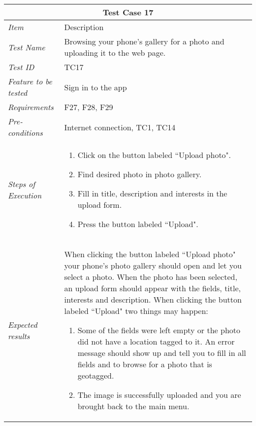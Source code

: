 %
\begin{minipage}{\linewidth}
\setlength{\tabcolsep}{15pt}
\centering
{}
\begin{tabular}{ |l|p{70mm}| }
	\hline
	\multicolumn{2}{|c|}{\cellcolor{gray!25} \textbf{Test Case 17}} \\
	\hline
	\it{\cellcolor{gray!25}Item} & {\cellcolor{gray!25} Description } \\
	\hline
	\it{\cellcolor{gray!25}Test Name } & Browsing your phone's gallery for a photo and uploading it to the web page. \\ \hline
	\it{\cellcolor{gray!25}Test ID} & TC17 \\ \hline
	\it{\cellcolor{gray!25}Feature to be tested} & Sign in to the app \\ \hline
	\it{\cellcolor{gray!25}Requirements} & F27, F28, F29 \\ \hline
	\it{\cellcolor{gray!25}Pre-conditions} & Internet connection, TC1, TC14 \\ \hline
	\it{\cellcolor{gray!25}Steps of Execution} & \begin{enumerate}
	                                       \item Click on the button labeled ``Upload photo".
	                                       \item Find desired photo in photo gallery.
	                                       \item Fill in title, description and interests in the upload form.
	                                       \item Press the button labeled ``Upload".
	                                     \end{enumerate} \\ \hline
	\it{\cellcolor{gray!25}Expected results} & When clicking the button labeled ``Upload photo" your phone's photo gallery should open and let you select  a photo. When the photo has been selected,  an upload form should appear with the fields, title, interests and description. When clicking the button labeled ``Upload" two things may happen: \begin{enumerate}[label=\alph*)]
	                                       \item Some of the fields were left empty or the photo did not have a location tagged to it. An error message should show up and tell you to fill in all fields and to browse for a photo that is geotagged.
	                                       \item The image is successfully uploaded and you are brought back to the main menu.
	                                     \end{enumerate} \\
	\hline
\end{tabular}
\medskip
\end{minipage}
